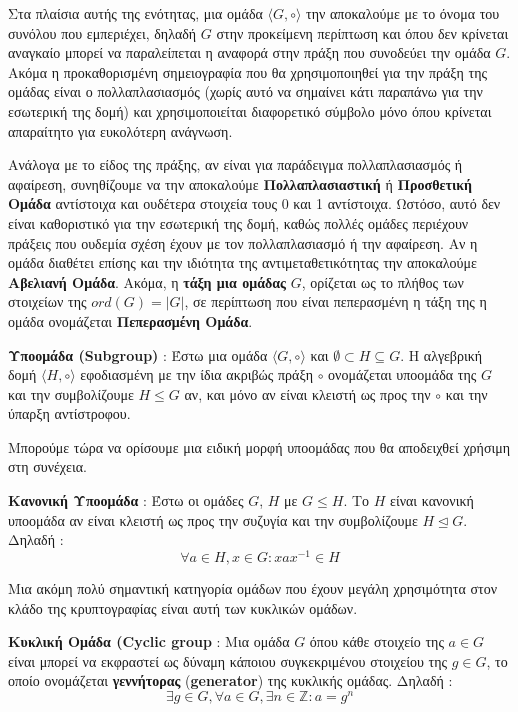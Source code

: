 Στα πλαίσια αυτής της ενότητας, μια ομάδα $\langle G, \circ \rangle$ την αποκαλούμε με το όνομα του συνόλου που εμπεριέχει, δηλαδή $G$ στην προκείμενη περίπτωση και όπου δεν κρίνεται αναγκαίο μπορεί να παραλείπεται η αναφορά στην πράξη που συνοδεύει την ομάδα $G$. Ακόμα η προκαθορισμένη σημειογραφία που θα χρησιμοποιηθεί για την πράξη της ομάδας είναι ο πολλαπλασιασμός (χωρίς αυτό να σημαίνει κάτι παραπάνω για την εσωτερική της δομή) και χρησιμοποιείται διαφορετικό σύμβολο μόνο όπου κρίνεται απαραίτητο για ευκολότερη ανάγνωση.

Ανάλογα με το είδος της πράξης, αν είναι για παράδειγμα πολλαπλασιασμός ή αφαίρεση, συνηθίζουμε να την αποκαλούμε \textbf{Πολλαπλασιαστική} ή \textbf{Προσθετική Ομάδα} αντίστοιχα και ουδέτερα στοιχεία τους 0 και 1 αντίστοιχα. Ωστόσο, αυτό δεν είναι καθοριστικό για την εσωτερική της δομή, καθώς πολλές ομάδες περιέχουν πράξεις που ουδεμία σχέση έχουν με τον πολλαπλασιασμό ή την αφαίρεση. Αν η ομάδα διαθέτει επίσης και την ιδιότητα της αντιμεταθετικότητας την αποκαλούμε \textbf{Αβελιανή Ομάδα}. Ακόμα, η \textbf{τάξη μια ομάδας} $G$, ορίζεται ως το πλήθος των στοιχείων της $ord(G)=|G|$, σε περίπτωση που είναι πεπερασμένη η τάξη της η ομάδα ονομάζεται \textbf{Πεπερασμένη Ομάδα}.

\begin{definition}
\textbf{Υποομάδα (Subgroup)} : Έστω μια ομάδα $\langle G, \circ \rangle$ και $\emptyset \subset Η \subseteq G$. Η αλγεβρική δομή $\langle H, \circ \rangle$ εφοδιασμένη με την ίδια ακριβώς πράξη $\circ$ ονομάζεται υποομάδα της $G$ και την συμβολίζουμε $H \leq G$ αν, και μόνο αν είναι κλειστή ως προς την $\circ$ και την ύπαρξη αντίστροφου. 
\end{definition}

Μπορούμε τώρα να ορίσουμε μια ειδική μορφή υποομάδας που θα αποδειχθεί χρήσιμη στη συνέχεια.

\begin{definition}
\textbf{Κανονική Υποομάδα} : Έστω οι ομάδες $G$, $H$ με $G \leq H$. Το $H$ είναι κανονική υποομάδα αν είναι κλειστή ως προς την συζυγία και την συμβολίζουμε $H \trianglelefteq G$. Δηλαδή :
$$
\forall a \in H, x \in G : xax^{-1} \in H
$$
\end{definition}

Μια ακόμη πολύ σημαντική κατηγορία ομάδων που έχουν μεγάλη χρησιμότητα στον κλάδο της κρυπτογραφίας είναι αυτή των κυκλικών ομάδων.

\begin{definition}
\textbf{Κυκλική Ομάδα (Cyclic group} : Μια ομάδα $G$ όπου κάθε στοιχείο της $a \in G$ είναι μπορεί να εκφραστεί ως δύναμη κάποιου συγκεκριμένου στοιχείου της $g \in G$, το οποίο ονομάζεται \textbf{γεννήτορας} (\textbf{generator}) της κυκλικής ομάδας. Δηλαδή :
$$
\exists g \in G, \forall a \in G, \exists n \in \mathbb{Z} : a = g^n
$$
\end{definition}

